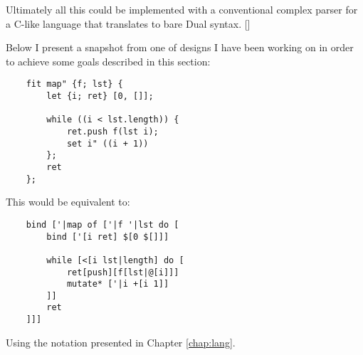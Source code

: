 Ultimately all this could be implemented with a conventional complex parser for a C-like language that translates to bare Dual syntax. []

Below I present a snapshot from one of designs I have been working on in order to achieve some goals described in this section:
\begin{lstlisting}
    fit map" {f; lst} {
    	let {i; ret} [0, []];
    	
    	while ((i < lst.length)) {
    		ret.push f(lst i);
    		set i" ((i + 1))
    	};
    	ret
    };
\end{lstlisting}

This would be equivalent to:
\begin{lstlisting}
    bind ['|map of ['|f '|lst do [
    	bind ['[i ret] $[0 $[]]]
    	
    	while [<[i lst|length] do [
    		ret[push][f[lst|@[i]]] 
    		mutate* ['|i +[i 1]]
    	]]
    	ret
    ]]]
\end{lstlisting}

Using the notation presented in Chapter \ref{chap:lang}.

